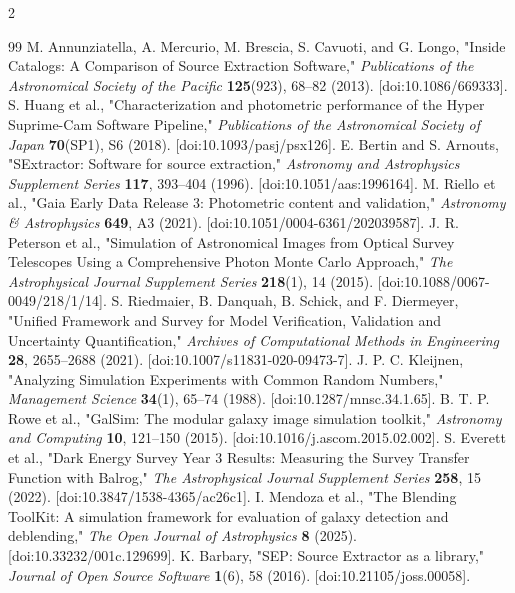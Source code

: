﻿\documentclass[12pt]{article}
\begin{document}
\begin{spacing}{2}
\begin{thebibliography}{99}
 M. Annunziatella, A. Mercurio, M. Brescia, S. Cavuoti, and G. Longo, "Inside Catalogs: A Comparison of Source Extraction Software," \textit{Publications of the Astronomical Society of the Pacific} \textbf{125}(923), 68--82 (2013). [doi:10.1086/669333].
 S. Huang et al., "Characterization and photometric performance of the Hyper Suprime-Cam Software Pipeline," \textit{Publications of the Astronomical Society of Japan} \textbf{70}(SP1), S6 (2018). [doi:10.1093/pasj/psx126].
 E. Bertin and S. Arnouts, "SExtractor: Software for source extraction," \textit{Astronomy and Astrophysics Supplement Series} \textbf{117}, 393--404 (1996). [doi:10.1051/aas:1996164].
 M. Riello et al., "Gaia Early Data Release 3: Photometric content and validation," \textit{Astronomy \& Astrophysics} \textbf{649}, A3 (2021). [doi:10.1051/0004-6361/202039587].
 J. R. Peterson et al., "Simulation of Astronomical Images from Optical Survey Telescopes Using a Comprehensive Photon Monte Carlo Approach," \textit{The Astrophysical Journal Supplement Series} \textbf{218}(1), 14 (2015). [doi:10.1088/0067-0049/218/1/14].
 S. Riedmaier, B. Danquah, B. Schick, and F. Diermeyer, "Unified Framework and Survey for Model Verification, Validation and Uncertainty Quantification," \textit{Archives of Computational Methods in Engineering} \textbf{28}, 2655--2688 (2021). [doi:10.1007/s11831-020-09473-7].
 J. P. C. Kleijnen, "Analyzing Simulation Experiments with Common Random Numbers," \textit{Management Science} \textbf{34}(1), 65--74 (1988). [doi:10.1287/mnsc.34.1.65].
 B. T. P. Rowe et al., "GalSim: The modular galaxy image simulation toolkit," \textit{Astronomy and Computing} \textbf{10}, 121--150 (2015). [doi:10.1016/j.ascom.2015.02.002].
 S. Everett et al., "Dark Energy Survey Year 3 Results: Measuring the Survey Transfer Function with Balrog," \textit{The Astrophysical Journal Supplement Series} \textbf{258}, 15 (2022). [doi:10.3847/1538-4365/ac26c1].
 I. Mendoza et al., "The Blending ToolKit: A simulation framework for evaluation of galaxy detection and deblending," \textit{The Open Journal of Astrophysics} \textbf{8} (2025). [doi:10.33232/001c.129699].
 K. Barbary, "SEP: Source Extractor as a library," \textit{Journal of Open Source Software} \textbf{1}(6), 58 (2016). [doi:10.21105/joss.00058].
\end{thebibliography}
\end{spacing}
\end{document}
